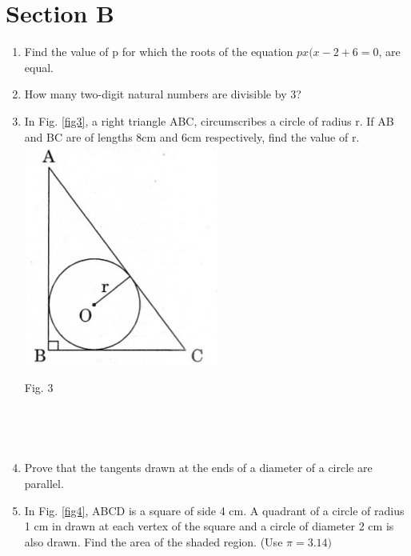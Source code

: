 \documentclass[journal,12pt,twocolumn]{IEEEtran}
\renewcommand\thesection{\arabic{section}}
\begin{document}
\section{Section B}
\renewcommand{\theequation}{\theenumi}
\begin{enumerate}[label=\thesection.\arabic*.,ref=\thesection.\theenumi]
\item Find the value of p for which the roots of the equation $px(x-2+6=0$, are equal.\\
\item How many two-digit natural numbers are divisible by 3?\\
\item In Fig. \ref{fig3}, a right triangle ABC, circumscribes a circle of radius r. If AB and BC are of lengths 8cm and 6cm respectively, find the value of r. \\

\includegraphics[width=0.5\columnwidth,center]{3.png}\\{\centering
\caption{Fig. 3}\\}
\label{fig3}\\
\item Prove that the tangents drawn at the ends of a diameter of a circle are parallel.\\
\item In Fig. \ref{fig4}, ABCD is a square of side 4 cm. A quadrant of a circle of radius 1 cm in drawn at each vertex of the square and a circle of diameter 2 cm is also drawn. Find the area of the shaded region. (Use $\pi = 3.14)$\\


\end{enumerate}
\end{document}
